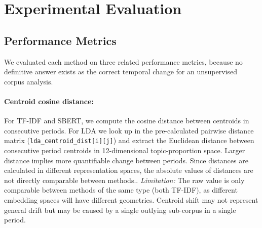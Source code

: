 \documentclass[11pt]{article}
\begin{document}
\begin{table}[ht]
\centering
\caption{Methods summary. CosDist = cosine distance; EuclDist = Euclidean distance.}
\label{tab:methods_summary}
\end{table}

\section{Experimental Evaluation}
\label{sec:evaluation}

\subsection{Performance Metrics}
We evaluated each method on three related performance metrics, because no definitive answer exists as the correct temporal change for an unsupervised corpus analysis.

\paragraph{Centroid cosine distance:} 
For TF-IDF and SBERT, we compute the cosine distance between centroids in consecutive periods. For LDA we look up in the pre-calculated pairwise distance matrix (\texttt{lda\_centroid\_dist[i][j]}) and extract the Euclidean distance between consecutive period centroids in 12-dimensional topic-proportion space. Larger distance implies more quantifiable change between periods. Since distances are calculated in different representation spaces, the absolute values of distances are not directly comparable between methods.. \emph{Limitation:} The raw value is only comparable between methods of the same type (both TF-IDF), as different embedding spaces will have different geometries. Centroid shift may not represent general drift but may be caused by a single outlying sub-corpus in a single period.
\end{document}
